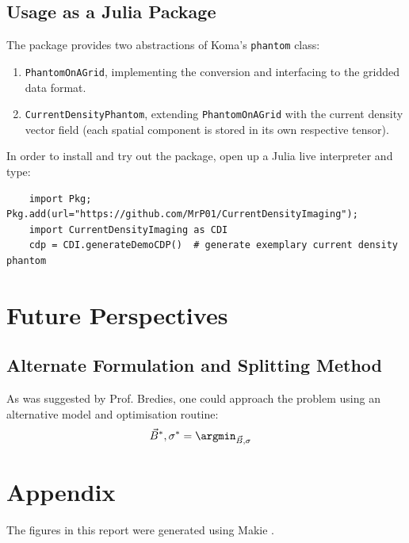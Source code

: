 \documentclass[12pt]{article}
\begin{document}
  \subsection{Usage as a Julia Package}
  The package provides two abstractions of Koma's \texttt{phantom} class:
  \begin{enumerate}
    \item \texttt{PhantomOnAGrid}, implementing the conversion and interfacing to the gridded data format.
    \item \texttt{CurrentDensityPhantom}, extending \texttt{PhantomOnAGrid} with the current density vector field (each spatial component is stored in its own respective tensor).
  \end{enumerate}

  In order to install and try out the package, open up a Julia live interpreter and type:
  \begin{verbatim}
    import Pkg; Pkg.add(url="https://github.com/MrP01/CurrentDensityImaging");
    import CurrentDensityImaging as CDI
    cdp = CDI.generateDemoCDP()  # generate exemplary current density phantom
  \end{verbatim}

  \section{Future Perspectives}
  \subsection{Alternate Formulation and Splitting Method}
  As was suggested by Prof. Bredies, one could approach the problem using an alternative model and optimisation routine:
  \begin{align*}
    \vec{B}^*, \sigma^* & = \argmin_{\vec{B}, \sigma}
  \end{align*}

  \vspace{4cm}

  \vspace{2cm}

  \pagebreak
  \printbibliography
  \printnoidxglossary[type=acronym, title={Acronyms}]

  \appendix
  \section{Appendix}
  The figures in this report were generated using Makie \parencite{2021-makie}.
\end{document}
